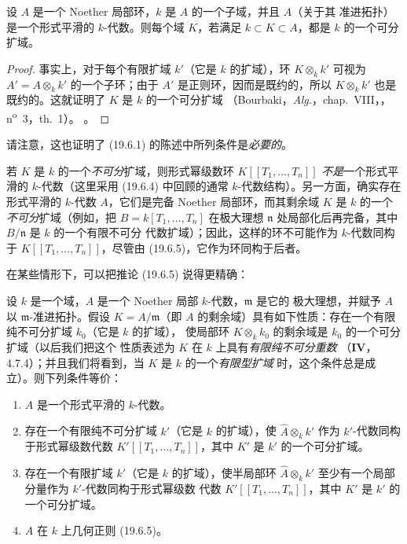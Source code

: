
\begin{corollary}[19.6.5.1]
\label{0.19.6.5.1-fr}
设 $A$ 是一个 Noether 局部环，$k$ 是 $A$ 的一个子域，并且 $A$（关于其
准进拓扑）是一个形式平滑的 $k$-代数。则每个域 $K$，若满足
$k\subset K\subset A$，都是 $k$ 的一个可分扩域。
\end{corollary}

\begin{proof}
事实上，对于每个有限扩域 $k'$（它是 $k$ 的扩域），环 $K\otimes_k k'$ 可视为
$A'=A\otimes_k k'$ 的一个子环；由于 $A'$ 是正则环，因而是既约的，所以
$K\otimes_k k'$ 也是既约的。这就证明了 $K$ 是 $k$ 的一个可分扩域
（Bourbaki，\emph{Alg.}，chap.~VIII，，
n\textsuperscript{o}~3，th.~1）。
。
\end{proof}

请注意，这也证明了 (19.6.1) 的陈述中所列条件是\emph{必要的}。

\begin{remark}[19.6.5.2]
\label{0.19.6.5.2-fr}
若 $K$ 是 $k$ 的一个\emph{不可分}扩域，则形式幂级数环
$K[[T_1,\ldots,T_n]]$ \emph{不是}一个形式平滑的 $k$-代数（这里采用
(19.6.4) 中回顾的通常 $k$-代数结构）。另一方面，确实存在形式平滑的
$k$-代数 $A$，它们是完备 Noether 局部环，而其剩余域 $K$ 是 $k$ 的一个
\emph{不可分}扩域（例如，把 $B=k[T_1,\ldots,T_n]$ 在极大理想
$\mathfrak n$ 处局部化后再完备，其中 $B/\mathfrak n$ 是 $k$ 的一个有限不可分
代数扩域）；因此，这样的环不可能作为 $k$-代数同构于
$K[[T_1,\ldots,T_n]]$，尽管由 (19.6.5)，它作为环同构于后者。

在某些情形下，可以把推论 (19.6.5) 说得更精确：
\end{remark}

\begin{proposition}[19.6.6]
\label{0.19.6.6-fr}
设 $k$ 是一个域，$A$ 是一个 Noether 局部 $k$-代数，$\mathfrak m$ 是它的
极大理想，并赋予 $A$ 以 $\mathfrak m$-准进拓扑。假设
$K=A/\mathfrak m$（即 $A$ 的剩余域）具有如下性质：存在一个有限纯不可分扩域
$k_0$（它是 $k$ 的扩域），
使局部环 $K\otimes_k k_0$ 的剩余域是 $k_0$ 的一个可分扩域（以后我们把这个
性质表述为 $K$ 在 $k$ 上具有\emph{有限纯不可分重数}
（$\mathbf{IV}$，4.7.4）；并且我们将看到，当 $K$ 是 $k$ 的一个\emph{有限型扩域}
时，这个条件总是成立）。则下列条件等价：
\begin{enumerate}
  \item[a)] $A$ 是一个形式平滑的 $k$-代数。
  \item[b)] 存在一个有限纯不可分扩域 $k'$（它是 $k$ 的扩域），使
  $\widehat A\otimes_k k'$ 作为 $k'$-代数同构于形式幂级数代数
  $K'[[T_1,\ldots,T_n]]$，其中 $K'$ 是 $k'$ 的一个可分扩域。
  \item[b')] 存在一个有限扩域 $k'$（它是 $k$ 的扩域），使半局部环
  $\widehat A\otimes_k k'$ 至少有一个局部分量作为 $k'$-代数同构于形式幂级数
  代数 $K'[[T_1,\ldots,T_n]]$，其中 $K'$ 是 $k'$ 的一个可分扩域。
  \item[c)] $A$ 在 $k$ 上几何正则 (19.6.5)。
\end{enumerate}
\end{proposition}

